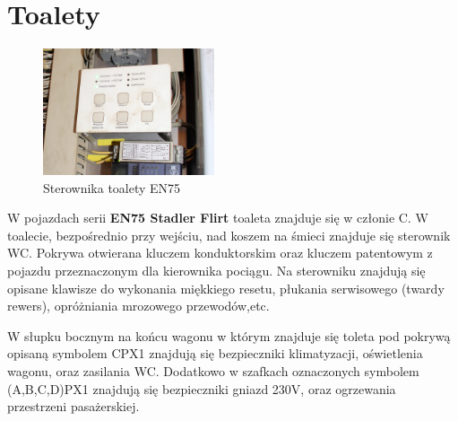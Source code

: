 \section{Toalety}
\begin{figure}
	\includegraphics[width=0.45\textwidth]{skryptkierownik-img/skryptkierownik-img039.jpg}
	\caption{Sterownika toalety EN75}
\end{figure}
	W pojazdach serii \textbf{EN75 Stadler Flirt} toaleta znajduje się w członie C. W toalecie, bezpośrednio przy wejściu, nad koszem na śmieci znajduje się sterownik WC. Pokrywa otwierana kluczem konduktorskim oraz kluczem patentowym z pojazdu przeznaczonym dla kierownika pociągu. Na sterowniku znajdują się opisane klawisze do wykonania miękkiego resetu, płukania serwisowego (twardy rewers), opróżniania mrozowego przewodów,etc.

W słupku bocznym na końcu wagonu w którym znajduje się toleta pod pokrywą opisaną symbolem CPX1 znajdują się bezpieczniki klimatyzacji, oświetlenia wagonu, oraz zasilania WC. Dodatkowo w szafkach oznaczonych symbolem (A,B,C,D)PX1 znajdują się bezpieczniki gniazd 230V, oraz ogrzewania przestrzeni pasażerskiej. 

